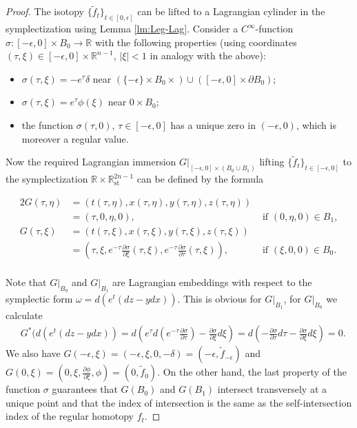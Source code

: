 \documentclass[reqno,11pt]{amsart}
\numberwithin{equation}{section}
\theoremstyle{my}
\theoremstyle{my}
\theoremstyle{your}
\newcommand{\R}{\mathbb{R}}
\newcommand{\pa}{\partial}
\newcommand{\st}{\mathrm{st}}
\newcommand{\p}{\partial }
\newcommand{\eps}{\epsilon}
\newcommand{\wt}{\widetilde}
\begin{document}
\begin{proof}
The isotopy $\{\wt f_t\}_{t\in[0,\eps]}$ can be lifted to a Lagrangian cylinder in the symplectization using  Lemma \ref{lm:Leg-Lag}. Consider a $C^\infty$-function $\sigma\colon [-\eps,0]\times B_0\to\R$ with the following properties (using coordinates $(\tau,\xi)\in[-\eps,0]\times\R^{n-1}$, $|\xi|<1$ in analogy with the above):
\begin{itemize}
\item $\sigma(\tau,\xi)=-e^{\tau}\delta$  near $(\{-\eps\}\times B_0\times)\cup ([-\eps,0]\times\p B_0)$;
 \item $\sigma(\tau,\xi)=e^{\tau}\phi(\xi)$  near $0\times B_0$;
 \item  the function $\sigma(\tau,0)$, $\tau\in[-\eps,0]$ has a unique zero  in
 $(-\eps,0)$, which is moreover a regular value.
\end{itemize}
Now the required Lagrangian immersion $G|_{[-\eps,0]\times(B_0\cup B_1)}$ lifting
$\{\wt f_t\}_{t\in[-\eps,0]}$  to the symplectization $\R\times \R^{2n-1}_\st$ can be defined by the formula

\begin{alignat*}{2}
G(\tau,\eta)&=(t(\tau,\eta),x(\tau,\eta),y(\tau,\eta),z(\tau,\eta))&\\
&=(\tau,0,\eta,0),&\text{ if }(0,\eta,0)\in B_1,\\
G(\tau,\xi)&=(t(\tau,\xi),x(\tau,\xi),y(\tau,\xi),z(\tau,\xi))&\\
&=
\left(\tau,\xi,e^{-\tau}\frac{\pa\sigma}{\pa\xi}(\tau,\xi),e^{-\tau}\frac{\pa\sigma}{\pa \tau}(\tau,\xi)\right),&\text{ if }(\xi,0,0)\in B_0.\\
\end{alignat*}

Note that $G|_{B_0}$ and $G|_{B_1}$ are Lagrangian embeddings with respect to the symplectic form $\omega=d(e^t(dz-ydx))$. This is obvious for $G|_{B_1}$, for $G|_{B_0}$ we calculate 
\begin{align*}
 &G^*(d(e^t(dz-ydx))=d\left(e^\tau d\left(e^{-\tau}\frac{\pa\sigma}{\pa \tau}\right)- \frac{\pa\sigma}{\pa\xi}d\xi\right)=
d\left(-\frac{\pa\sigma}{\pa\tau}d\tau-\frac{\pa\sigma}{\pa\xi}d\xi\right)=0.
\end{align*}
We also have
$G(-\eps,\xi)=(-\eps,\xi,0,-\delta)=(-\eps,\wt f_{-\eps})$ and $G(0,\xi)=
\left(0,\xi,\frac{\p\phi}{\p \xi},\phi\right)=(0,\wt f_{0}).$
On the other hand,    the last property of the function $\sigma$ guarantees that $G(B_0)$ and $G(B_1)$ intersect transversely at a unique point and that  the index of intersection is the same as the self-intersection index of the regular homotopy $f_t$.
\end{proof}
           
\end{document}
